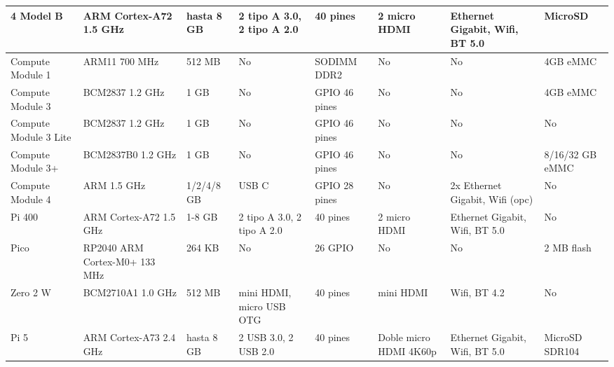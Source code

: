 {\begin{longtable}{|p{1.8cm}|p{2.8cm}|p{1.2cm}|p{1.5cm}|p{1.5cm}|p{2.0cm}|p{2.0cm}|p{2.0cm}|}
            4 Model B                        & ARM Cortex-A72 1.5 GHz        & hasta 8 GB      & 2 tipo A 3.0, 2 tipo A 2.0 & 40 pines          & 2 micro HDMI             & Ethernet Gigabit, Wifi, BT 5.0 & MicroSD                         \\ \hline
            Compute Module 1                 & ARM11 700 MHz                 & 512 MB          & No                         & SODIMM DDR2       & No                       & No                             & 4GB eMMC                        \\ \hline
            Compute Module 3                 & BCM2837 1.2 GHz               & 1 GB            & No                         & GPIO 46 pines     & No                       & No                             & 4GB eMMC                        \\ \hline
            Compute Module 3 Lite            & BCM2837 1.2 GHz               & 1 GB            & No                         & GPIO 46 pines     & No                       & No                             & No                              \\ \hline
            Compute Module 3+                & BCM2837B0 1.2 GHz             & 1 GB            & No                         & GPIO 46 pines     & No                       & No                             & 8/16/32 GB eMMC                 \\ \hline
            Compute Module 4                 & ARM 1.5 GHz                   & 1/2/4/8 GB      & USB C                      & GPIO 28 pines     & No                       & 2x Ethernet Gigabit, Wifi (opc) & No                              \\ \hline
            Pi 400                           & ARM Cortex-A72 1.5 GHz        & 1-8 GB          & 2 tipo A 3.0, 2 tipo A 2.0 & 40 pines          & 2 micro HDMI             & Ethernet Gigabit, Wifi, BT 5.0 & No                              \\ \hline
            Pico                             & RP2040 ARM Cortex-M0+ 133 MHz & 264 KB          & No                         & 26 GPIO           & No                       & No                             & 2 MB flash                      \\ \hline
            Zero 2 W                         & BCM2710A1 1.0 GHz             & 512 MB          & mini HDMI, micro USB OTG   & 40 pines          & mini HDMI                & Wifi, BT 4.2                  & No                              \\ \hline
            Pi 5                             & ARM Cortex-A73 2.4 GHz        & hasta 8 GB      & 2 USB 3.0, 2 USB 2.0       & 40 pines          & Doble micro HDMI 4K60p   & Ethernet Gigabit, Wifi, BT 5.0 & MicroSD SDR104                  \\ \hline
        \end{longtable}
}